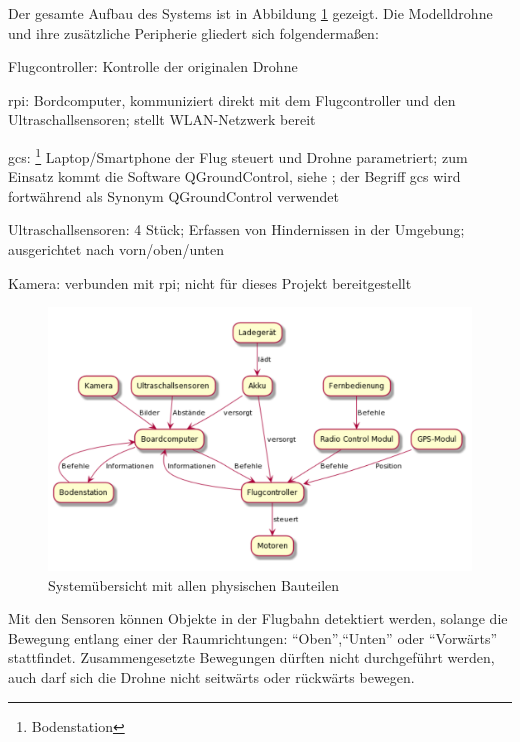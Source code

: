 Der gesamte Aufbau des Systems ist in Abbildung \ref{fig:setup_initial} gezeigt. Die Modelldrohne und ihre zusätzliche Peripherie gliedert sich folgendermaßen:
\begin{compactdesc}
    \item[Flugcontroller:] Kontrolle der originalen Drohne
    \item[\gls{rpi}:] Bordcomputer, kommuniziert direkt mit dem Flugcontroller und den Ultraschallsensoren; stellt WLAN-Netzwerk bereit
	\item[\gls{gcs}:]\footnote{Bodenstation} Laptop/Smartphone der Flug steuert und Drohne parametriert; zum Einsatz kommt die Software QGroundControl, siehe \cite[Kapitel 4.3.5]{wirthErweiterungBestehendenDrohne2022}; der Begriff \gls{gcs} wird fortwährend als Synonym QGroundControl verwendet
    \item[Ultraschallsensoren:] 4 Stück; Erfassen von Hindernissen in der Umgebung; ausgerichtet nach vorn/oben/unten
    \item[Kamera:] verbunden mit \gls{rpi}; nicht für dieses Projekt bereitgestellt
\end{compactdesc}

\begin{figure}[!h]
	\includegraphics[width=\linewidth]{images/systemuebersicht.png}
	\caption{Systemübersicht mit allen physischen Bauteilen\cite[Kapitel 4.3]{wirthErweiterungBestehendenDrohne2022}}
	\label{fig:setup_initial}
	\end{figure}

Mit den Sensoren können Objekte in der Flugbahn detektiert werden, solange die Bewegung entlang einer der Raumrichtungen: \enquote{Oben},\enquote{Unten} oder \enquote{Vorwärts} stattfindet. Zusammengesetzte Bewegungen dürften nicht durchgeführt werden, auch darf sich die Drohne nicht seitwärts oder rückwärts bewegen.

